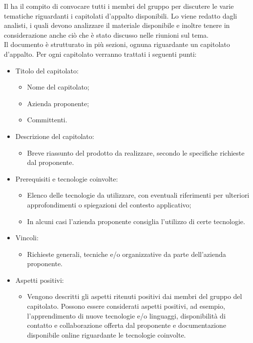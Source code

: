 Il \Responsabile{} ha il compito di convocare tutti i membri del gruppo \Gruppo{} per discutere le varie tematiche riguardanti i capitolati d'appalto disponibili.
Lo \SdF{} viene redatto dagli analisti, i quali devono analizzare il materiale disponibile e inoltre tenere in considerazione anche ciò che è stato discusso nelle riunioni sul tema.\\
Il documento è strutturato in più sezioni, ognuna riguardante un capitolato d'appalto.
Per ogni capitolato verranno trattati i seguenti punti:
\begin{itemize}
\item Titolo del capitolato:
	\begin{itemize}
	\item Nome del capitolato;
	\item Azienda proponente;
	\item Committenti.
	\end{itemize}
\item Descrizione del capitolato:
	\begin{itemize}
	\item Breve riassunto del prodotto da realizzare, secondo le specifiche richieste dal proponente.
	\end{itemize}
\item Prerequisiti e tecnologie coinvolte:
	\begin{itemize}
	\item Elenco delle tecnologie da utilizzare, con eventuali riferimenti per ulteriori approfondimenti o spiegazioni del contesto applicativo;
	\item In alcuni casi l'azienda proponente consiglia l'utilizzo di certe tecnologie.
	\end{itemize}
\item Vincoli:
	\begin{itemize}
	\item Richieste generali, tecniche e/o organizzative da parte dell'azienda proponente.
	\end{itemize}
\item Aspetti positivi:
	\begin{itemize}
	\item Vengono descritti gli aspetti ritenuti positivi dai membri del gruppo \Gruppo{} del capitolato.
	Possono essere considerati aspetti positivi, ad esempio, l'apprendimento di nuove tecnologie e/o linguaggi, disponibilità di contatto e collaborazione offerta dal proponente e documentazione disponibile online riguardante le tecnologie coinvolte.
	\end{itemize}

\end{itemize}
